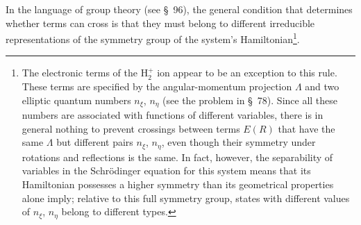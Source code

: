In the language of group theory (see \S~96), the general condition that determines whether terms can cross is that they must belong to different irreducible representations of the symmetry group of the system's Hamiltonian\footnote{The electronic terms of the $\mathrm H_2^+$ ion appear to be an exception to this rule. These terms are specified by the angular-momentum projection $\Lambda$ and two elliptic quantum numbers $n_\xi$, $n_\eta$ (see the problem in \S~78). Since all these numbers are associated with functions of different variables, there is in general nothing to prevent crossings between terms $E(R)$ that have the same $\Lambda$ but different pairs $n_\xi$, $n_\eta$, even though their symmetry under rotations and reflections is the same. In fact, however, the separability of variables in the Schrödinger equation for this system means that its Hamiltonian possesses a higher symmetry than its geometrical properties alone imply; relative to this full symmetry group, states with different values of $n_\xi$, $n_\eta$ belong to different types.}.
